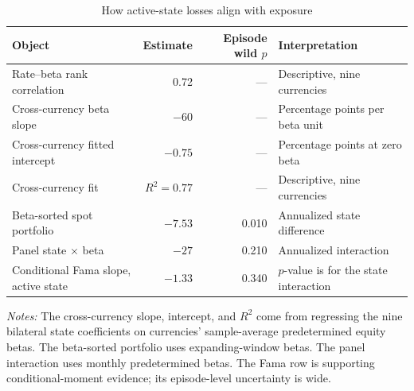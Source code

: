 \begin{table}[H]
\centering
\caption{How active-state losses align with exposure}
\label{tab:exposure-ordering}
\small
\begin{tabularx}{\textwidth}{>{\raggedright\arraybackslash}X r r l}
\toprule
Object & Estimate & Episode wild $p$ & Interpretation \\
\midrule
Rate--beta rank correlation & 0.72 & --- & Descriptive, nine currencies \\
Cross-currency beta slope & $-60$ & --- & Percentage points per beta unit \\
Cross-currency fitted intercept & $-0.75$ & --- & Percentage points at zero beta \\
Cross-currency fit & $R^2=0.77$ & --- & Descriptive, nine currencies \\
Beta-sorted spot portfolio & $-7.53$ & 0.010 & Annualized state difference \\
Panel state $\times$ beta & $-27$ & 0.210 & Annualized interaction \\
Conditional Fama slope, active state & $-1.33$ & 0.340 & $p$-value is for the state interaction \\
\bottomrule
\end{tabularx}

\begin{minipage}{0.94\textwidth}
\footnotesize\emph{Notes:} The cross-currency slope, intercept, and $R^2$ come from regressing the nine bilateral state coefficients on currencies' sample-average predetermined equity betas. The beta-sorted portfolio uses expanding-window betas. The panel interaction uses monthly predetermined betas. The Fama row is supporting conditional-moment evidence; its episode-level uncertainty is wide.
\end{minipage}
\end{table}
